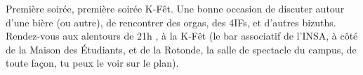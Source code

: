Première soirée, première soirée K-Fêt. Une bonne occasion de discuter autour
d'une bière (ou autre),  de rencontrer des orgas, des 4IFs, et d'autres bizuths.
Rendez-vous aux alentours de 21h , à la K-Fêt (le bar associatif de l'INSA, à
côté de la Maison des Étudiants, et de la Rotonde, la salle de spectacle
du campus, de toute façon, tu peux le voir sur le plan).
